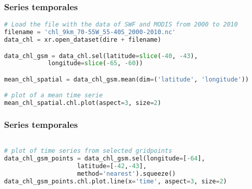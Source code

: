 \documentclass{beamer}
\begin{document}
\begin{frame}[t, fragile]
\frametitle{Series temporales}

\begin{lstlisting}[language=python, basicstyle=\scriptsize]
# Load the file with the data of SWF and MODIS from 2000 to 2010
filename = 'chl_9km_70-55W_55-40S_2000-2010.nc'    
data_chl = xr.open_dataset(dire + filename)

data_chl_gsm = data_chl.sel(latitude=slice(-40, -43), 
			longitude=slice(-65, -60)) 

mean_chl_spatial = data_chl_gsm.mean(dim=('latitude', 'longitude'))

# plot of a mean time serie
mean_chl_spatial.chl.plot(aspect=3, size=2)
\end{lstlisting}

\begin{figure}
	
	
\end{figure}

\end{frame}

\begin{frame}[t, fragile]
\frametitle{Series temporales}

\begin{lstlisting}[language=python, basicstyle=\scriptsize]

# plot of time series from selected gridpoints
data_chl_gsm_points = data_chl_gsm.sel(longitude=[-64], 
					latitude=[-42,-43], 
					method='nearest').squeeze()
data_chl_gsm_points.chl.plot.line(x='time', aspect=3, size=2)
\end{lstlisting}

\begin{figure}
	
	
\end{figure}

\end{frame}
\end{document}
